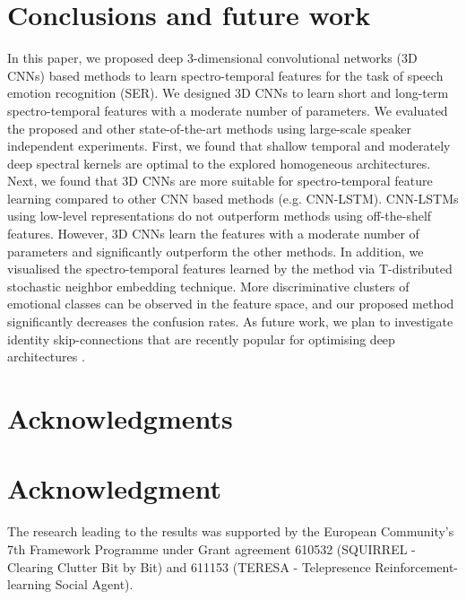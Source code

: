\documentclass[conference, compsoc, twoside]{IEEEtran}
\begin{document}
\section{Conclusions and future work}\label{sec:conclusion}
In this paper, we proposed deep 3-dimensional convolutional networks (3D CNNs) based methods to learn spectro-temporal features for the task of speech emotion recognition (SER). We designed 3D CNNs to learn short and long-term spectro-temporal features with a moderate number of parameters. We evaluated the proposed and other state-of-the-art methods using large-scale speaker independent experiments. First, we found that shallow temporal and moderately deep spectral kernels are optimal to the explored homogeneous architectures. Next, we found that 3D CNNs are more suitable for spectro-temporal feature learning compared to other CNN based methods (e.g. CNN-LSTM). CNN-LSTMs using low-level representations do not outperform methods using off-the-shelf features. However, 3D CNNs learn the features with a moderate number of parameters and significantly outperform the other methods. In addition, we visualised the spectro-temporal features learned by the method via T-distributed stochastic neighbor embedding technique. More discriminative clusters of emotional classes can be observed in the feature space, and our proposed method significantly decreases the confusion rates. As future work, we plan to investigate identity skip-connections that are recently popular for optimising deep architectures \cite{veit2016residual}.

\ifCLASSOPTIONcompsoc
  \section*{Acknowledgments}
\else
  \section*{Acknowledgment}
\fi

The research leading to the results was supported by the European Community's 7th Framework Programme under Grant agreement 610532 (SQUIRREL - Clearing Clutter Bit by Bit) and 611153 (TERESA - Telepresence Reinforcement-learning Social Agent).
\clearpage
\small


\end{document}
